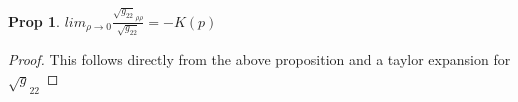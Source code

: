 \documentclass[11pt]{article}
\newtheorem{prop}{Prop}
\begin{document}
\begin{prop}
	$lim_{\rho \to 0} \frac{\sqrt{g_{22}}_{\rho \rho}}{\sqrt{g_{22}}} = - K(p)$
\end{prop}

\begin{proof}
	This follows directly from the above proposition and a taylor expansion for $\sqrt{g}_{22}$
\end{proof}

	
\end{document}
